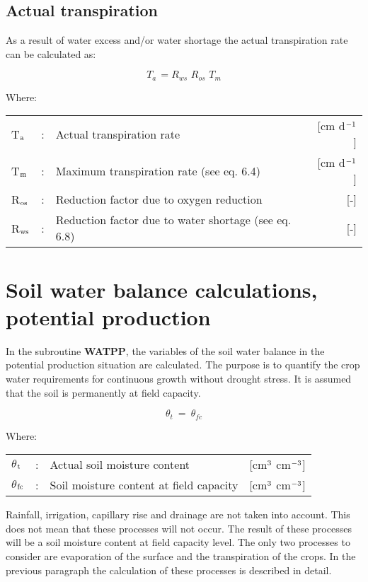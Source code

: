 \subsection{Actual transpiration}
As a result of water excess and/or water shortage the actual transpiration rate can be
calculated as:

\begin{equation}
T_{a~} = R_{ws} \,\, R_{os} \,\, T_{m} 
\end{equation}

Where:\\
\begin{tabularx}{\textwidth}{llXr}
 T$_{{\rm a}}$ &:& Actual transpiration rate & [cm d$^{{\rm -1}}$]\\
 T$_{{\rm m}}$ &:& Maximum transpiration rate (see eq. 6.4) & [cm d$^{{\rm -1}}$]\\
 R$_{{\rm os}}$ &:& Reduction factor due to oxygen reduction & [-]\\
 R$_{{\rm ws}}$ &:& Reduction factor due to water shortage (see eq. 6.8) & [-]\\
\end{tabularx}
 
\section{Soil water balance calculations, potential production}

In the subroutine {\bf WATPP}, the variables of the soil water balance in the potential 
production situation are calculated. The purpose is to quantify the crop water requirements for
continuous growth without drought stress. It is assumed that the soil is permanently at
field capacity.

\begin{equation}
\theta  _{t} ~ =~\theta  _{fc} 
\end{equation}

Where:\\
\begin{tabularx}{\textwidth}{llXr}
 $\theta$$_{{\rm t}}$ &:& Actual soil moisture content & [cm$^{{\rm 3}}$ cm$^{{\rm -3}}$]\\
 $\theta$$_{{\rm fc}}$ &:& Soil moisture content at field capacity & [cm$^{{\rm 3}}$ cm$^{{\rm -3}}$]\\
\end{tabularx}
 
Rainfall, irrigation, capillary rise and drainage are not taken into account. This does not
mean that these processes will not occur. The result of these processes will be a soil
moisture content at field capacity level. The only two processes to consider are evapora\-tion of 
the surface and the transpiration of the crops. In the previous paragraph the
calculation of these processes is described in detail.

